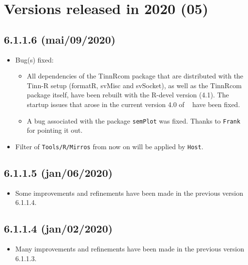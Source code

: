 
\hypertarget{2020}{}
\section{Versions released in 2020 (05)}

\subsection*{6.1.1.6 (mai/09/2020)}
\begin{itemize}
  \item Bug(s) fixed:
    \begin{itemize}
      \item All dependencies of the TinnRcom package that are distributed with the Tinn-R setup
        (formatR, svMisc and svSocket), as well as the TinnRcom package itself, have been rebuilt
        with the R-devel version (4.1). The startup issues that arose in the current version 4.0 of
        \RR~ have been fixed.
      \item A bug associated with the package \texttt{semPlot} was fixed.
        Thanks to \texttt{Frank} for pointing it out.
    \end{itemize}
  \item Filter of \texttt{Tools/R/Mirros} from now on will be applied by \texttt{Host}.
\end{itemize}

\subsection*{6.1.1.5 (jan/06/2020)}
\begin{itemize}
  \item Some improvements and refinements have been made in the previous version 6.1.1.4.
\end{itemize}

\subsection*{6.1.1.4 (jan/02/2020)}
\begin{itemize}
  \item Many improvements and refinements have been made in the previous version 6.1.1.3.
\end{itemize}

